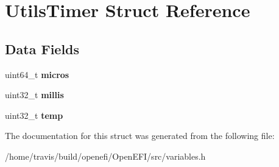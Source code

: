 \hypertarget{structUtilsTimer}{}\section{Utils\+Timer Struct Reference}
\label{structUtilsTimer}
\subsection*{Data Fields}
\begin{DoxyCompactItemize}
\item 
\mbox{\label{structUtilsTimer_a5cdccdeff0de6a795934c45e817cf149}} 
uint64\+\_\+t {\bfseries micros}
\item 
\mbox{\label{structUtilsTimer_ae325bf6a07bbd1d9cbe266d76278c3e3}} 
uint32\+\_\+t {\bfseries millis}
\item 
\mbox{\label{structUtilsTimer_abeb0419aca0c17b3b6f7af06126b091a}} 
uint32\+\_\+t {\bfseries temp}
\end{DoxyCompactItemize}


The documentation for this struct was generated from the following file\+:\begin{DoxyCompactItemize}
\item 
/home/travis/build/openefi/\+Open\+E\+F\+I/src/variables.\+h\end{DoxyCompactItemize}
